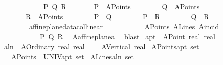 \begin{isabellebody}
\ \ \ \ \isamarkupfalse%
\isanewline
\ \ \isamarkupfalse%
\isanewline
{}\isamarkupfalse%
\isanewline
\ \ \isamarkupfalse%
\ {\isachardoublequoteopen}\ {\isasymexists}P\ Q\ R{\isachardot}{\kern0pt}\isanewline
\ \ \ \ \ \ \ P\ {\isasymin}\ A{}Points\ {\isasymand}\isanewline
\ \ \ \ \ \ \ Q\ {\isasymin}\ A{}Points\ {\isasymand}\isanewline
\ \ \ \ \ \ \ R\ {\isasymin}\ A{}Points\ {\isasymand}\isanewline
\ \ \ \ \ \ \ P\ {\isasymnoteq}\ Q\ {\isasymand}\isanewline
\ \ \ \ \ \ \ P\ {\isasymnoteq}\ R\ {\isasymand}\isanewline
\ \ \ \ \ \ \ Q\ {\isasymnoteq}\ R\ {\isasymand}\isanewline
\ \ \ \ \ \ \ {\isasymnot}\ affine{\isacharunderscore}{\kern0pt}plane{\isacharunderscore}{\kern0pt}data{\isachardot}{\kern0pt}collinear\isanewline
\ \ \ \ \ \ \ \ \ \ \ A{}Points\ A{}Lines\ A{}incid\isanewline
\ \ \ \ \ \ \ \ \ \ \ P\ Q\ R{\isachardoublequoteclose}\ \isamarkupfalse%
\ A{}affine{\isacharunderscore}{\kern0pt}plane{\isacharunderscore}{\kern0pt}a{}\ \isamarkupfalse%
\ blast\isanewline
{}\isamarkupfalse%
%
\endisatagproof
{\isafoldproof}%
%
\isadelimproof
\isanewline
%
\endisadelimproof
\isanewline
\isanewline
\isanewline
\isanewline
{}\isamarkupfalse%
\ a{}pt\ {\isacharequal}{\kern0pt}\ A{}Point\ {\isachardoublequoteopen}real{\isachardoublequoteclose}\ {\isachardoublequoteopen}real{\isachardoublequoteclose}\isanewline
{}\isamarkupfalse%
\ a{}ln\ {\isacharequal}{\kern0pt}\ A{}Ordinary\ {\isachardoublequoteopen}real{\isachardoublequoteclose}\ {\isachardoublequoteopen}real{\isachardoublequoteclose}\ \isanewline
\ \ {\isacharbar}{\kern0pt}\ A{}Vertical\ {\isachardoublequoteopen}real{\isachardoublequoteclose}\isanewline
\isanewline
{}\isamarkupfalse%
\ A{}Points{\isacharcolon}{\kern0pt}{\isacharcolon}{\kern0pt}{\isachardoublequoteopen}a{}pt\ set{\isachardoublequoteclose}\isanewline
\ \ \ {\isachardoublequoteopen}A{}Points\ {\isasymequiv}\ {\isacharparenleft}{\kern0pt}UNIV{\isacharcolon}{\kern0pt}{\isacharcolon}{\kern0pt}a{}pt\ set{\isacharparenright}{\kern0pt}{\isachardoublequoteclose}\isanewline
\isanewline
{}\isamarkupfalse%
\ A{}Lines{\isacharcolon}{\kern0pt}{\isacharcolon}{\kern0pt}{\isachardoublequoteopen}a{}ln\ set{\isachardoublequoteclose}\isanewline

\end{isabellebody}
